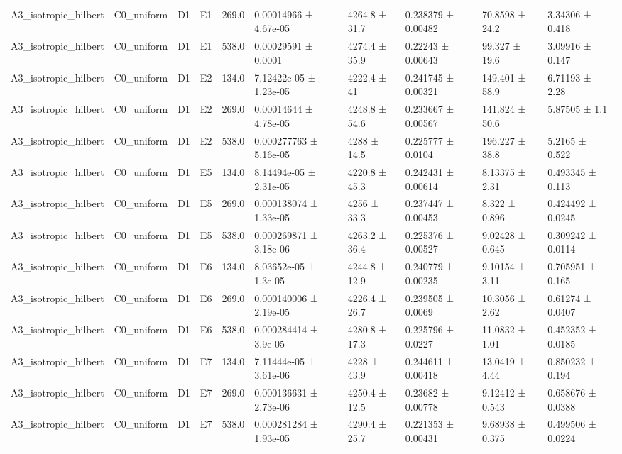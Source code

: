 \begin{table}
\begin{tabular}{llllllllll}
A3\_isotropic\_hilbert & C0\_uniform & D1 & E1 & 269.0 & 0.00014966 ± 4.67e-05 & 4264.8 ± 31.7 & 0.238379 ± 0.00482 & 70.8598 ± 24.2 & 3.34306 ± 0.418 \\
A3\_isotropic\_hilbert & C0\_uniform & D1 & E1 & 538.0 & 0.00029591 ± 0.0001 & 4274.4 ± 35.9 & 0.22243 ± 0.00643 & 99.327 ± 19.6 & 3.09916 ± 0.147 \\
A3\_isotropic\_hilbert & C0\_uniform & D1 & E2 & 134.0 & 7.12422e-05 ± 1.23e-05 & 4222.4 ± 41 & 0.241745 ± 0.00321 & 149.401 ± 58.9 & 6.71193 ± 2.28 \\
A3\_isotropic\_hilbert & C0\_uniform & D1 & E2 & 269.0 & 0.00014644 ± 4.78e-05 & 4248.8 ± 54.6 & 0.233667 ± 0.00567 & 141.824 ± 50.6 & 5.87505 ± 1.1 \\
A3\_isotropic\_hilbert & C0\_uniform & D1 & E2 & 538.0 & 0.000277763 ± 5.16e-05 & 4288 ± 14.5 & 0.225777 ± 0.0104 & 196.227 ± 38.8 & 5.2165 ± 0.522 \\
A3\_isotropic\_hilbert & C0\_uniform & D1 & E5 & 134.0 & 8.14494e-05 ± 2.31e-05 & 4220.8 ± 45.3 & 0.242431 ± 0.00614 & 8.13375 ± 2.31 & 0.493345 ± 0.113 \\
A3\_isotropic\_hilbert & C0\_uniform & D1 & E5 & 269.0 & 0.000138074 ± 1.33e-05 & 4256 ± 33.3 & 0.237447 ± 0.00453 & 8.322 ± 0.896 & 0.424492 ± 0.0245 \\
A3\_isotropic\_hilbert & C0\_uniform & D1 & E5 & 538.0 & 0.000269871 ± 3.18e-06 & 4263.2 ± 36.4 & 0.225376 ± 0.00527 & 9.02428 ± 0.645 & 0.309242 ± 0.0114 \\
A3\_isotropic\_hilbert & C0\_uniform & D1 & E6 & 134.0 & 8.03652e-05 ± 1.3e-05 & 4244.8 ± 12.9 & 0.240779 ± 0.00235 & 9.10154 ± 3.11 & 0.705951 ± 0.165 \\
A3\_isotropic\_hilbert & C0\_uniform & D1 & E6 & 269.0 & 0.000140006 ± 2.19e-05 & 4226.4 ± 26.7 & 0.239505 ± 0.0069 & 10.3056 ± 2.62 & 0.61274 ± 0.0407 \\
A3\_isotropic\_hilbert & C0\_uniform & D1 & E6 & 538.0 & 0.000284414 ± 3.9e-05 & 4280.8 ± 17.3 & 0.225796 ± 0.0227 & 11.0832 ± 1.01 & 0.452352 ± 0.0185 \\
A3\_isotropic\_hilbert & C0\_uniform & D1 & E7 & 134.0 & 7.11444e-05 ± 3.61e-06 & 4228 ± 43.9 & 0.244611 ± 0.00418 & 13.0419 ± 4.44 & 0.850232 ± 0.194 \\
A3\_isotropic\_hilbert & C0\_uniform & D1 & E7 & 269.0 & 0.000136631 ± 2.73e-06 & 4250.4 ± 12.5 & 0.23682 ± 0.00778 & 9.12412 ± 0.543 & 0.658676 ± 0.0388 \\
A3\_isotropic\_hilbert & C0\_uniform & D1 & E7 & 538.0 & 0.000281284 ± 1.93e-05 & 4290.4 ± 25.7 & 0.221353 ± 0.00431 & 9.68938 ± 0.375 & 0.499506 ± 0.0224 \\

\end{tabular}
\end{table}

